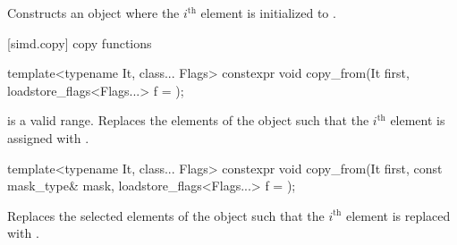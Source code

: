 \begin{itemdescr}
  \SimdLoadDescr
    {\validMaskedRange}
    {Constructs an object where the $i^\text{th}$ element is initialized to  \foralli.}
\end{itemdescr}

[simd.copy]{ copy functions}

\begin{itemdecl}
template<typename It, class... Flags>
  constexpr void copy_from(It first, loadstore_flags<Flags...> f = {});
\end{itemdecl}

\begin{itemdescr}
  \SimdLoadDescr
    {\tcode{[first, first + size())} is a valid range.}
    {Replaces the elements of the  object such that the $i^\text{th}$ element is assigned with  \foralli.}
\end{itemdescr}

\begin{itemdecl}
template<typename It, class... Flags>
  constexpr void copy_from(It first, const mask_type& mask, loadstore_flags<Flags...> f = {});
\end{itemdecl}

\begin{itemdescr}
  \SimdLoadDescr
    {\validMaskedRange}
    {Replaces the selected elements of the  object such that the $i^\text{th}$ element is replaced with  \forallmaskedi.}
\end{itemdescr}

\newcommand\SimdStoreDescr[2]{
  \pnum\constraints
  \begin{itemize}
    \item \tcode{is_simd_flag_type_v<Flags>} is \tcode{true}, and
    \item \tcode{iter_value_t<Out>} is a vectorizable type, and
    \item \tcode{Out} satisfies \tcode{contiguous_iterator}, and
    \item \tcode{Out} satisfies \tcode{output_iterator<value_type>}.
  \end{itemize}

  \pnum\mandates
  \conversionFlagsMandate{value_type}{iter_value_t<Out>}

  \pnum\expects
  \begin{itemize}
    \item #1
    \item \tcode{Out} models \tcode{contiguous_iterator}.
    \item \tcode{Out} models \tcode{output_iterator<value_type>}.
    \flagsRequires{simd, iter_value_t<Out>}{iter_value_t<Out>}
  \end{itemize}

  \pnum\effects #2

  \pnum\throws Nothing.
}

